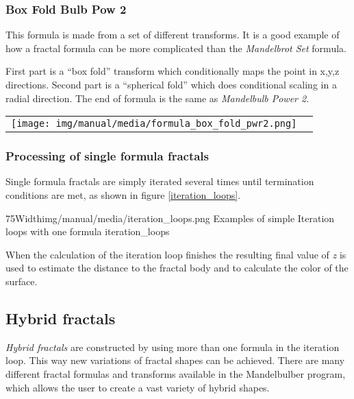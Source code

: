 \subsubsection{Box Fold Bulb Pow 2}

This formula is made from a set of different transforms. It is a good example of
how a fractal formula can be more complicated than the
\emph{Mandelbrot Set} formula.

First part is a ``box fold'' transform which conditionally maps the point in x,y,z  directions. Second part is a ``spherical fold'' which does conditional scaling in a radial direction.
The end of formula is the same as \emph{Mandelbulb Power 2}.

\begin{tabular}{l l}
	\texttt{[image: img/manual/media/formula\_box\_fold\_pwr2.png]}	
	& 
	\begin{minipage}[b]{0.5\linewidth}
		
	\end{minipage}
\end{tabular} 

\subsubsection{Processing of single formula fractals}

Single formula fractals are simply iterated several times until termination conditions are met, as shown in figure \ref{iteration_loops}. \nolinebreak \nopagebreak


\simpleImageWithCaption75Width{img/manual/media/iteration_loops.png}
{Examples of simple Iteration loops with one formula}
{iteration_loops}

When the calculation of the iteration loop finishes the resulting final value of \emph{z} is
used to estimate the distance to the fractal body and to calculate the color of the surface.

\subsection{Hybrid fractals}

\emph{Hybrid fractals} are constructed by using more than one formula in the iteration loop.
This way new variations of fractal shapes can be achieved. There are many different fractal formulas and transforms available in the Mandelbulber program, which allows the user to create a vast variety of hybrid shapes.

